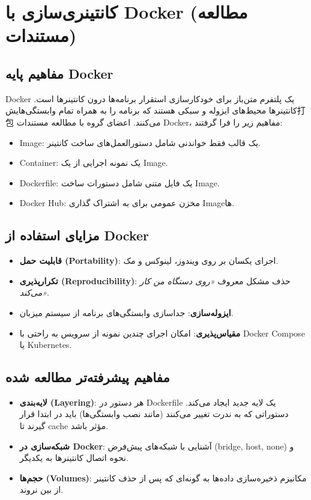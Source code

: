 \documentclass[12pt,a4paper]{report}
\newcommand{\eng}[1]{\textenglish{#1}}
\begin{document}
	\chapter{کانتینری‌سازی با Docker (مطالعه مستندات)}
	
	\section{مفاهیم پایه Docker}
	\eng{Docker} یک پلتفرم متن‌باز برای خودکارسازی استقرار برنامه‌ها درون کانتینرها است. کانتینرها محیط‌های ایزوله و سبکی هستند که برنامه را به همراه تمام وابستگی‌هایش打包 می‌کنند. اعضای گروه با مطالعه مستندات \eng{Docker}، مفاهیم زیر را فرا گرفتند:
	
	\begin{itemize}
		\item \eng{Image}: یک قالب فقط خواندنی شامل دستورالعمل‌های ساخت کانتینر.
		\item \eng{Container}: یک نمونه اجرایی از یک \eng{Image}.
		\item \eng{Dockerfile}: یک فایل متنی شامل دستورات ساخت \eng{Image}.
		\item \eng{Docker Hub}: مخزن عمومی برای به اشتراک گذاری \eng{Image}ها.
	\end{itemize}
	
	\section{مزایای استفاده از Docker}
	\begin{itemize}
		\item \textbf{قابلیت حمل (\eng{Portability})}: اجرای یکسان بر روی ویندوز، لینوکس و مک.
		\item \textbf{تکرارپذیری (\eng{Reproducibility})}: حذف مشکل معروف \emph{«روی دستگاه من کار می‌کند»}.
		\item \textbf{ایزوله‌سازی}: جداسازی وابستگی‌های برنامه از سیستم میزبان.
		\item \textbf{مقیاس‌پذیری}: امکان اجرای چندین نمونه از سرویس به راحتی با \eng{Docker Compose} یا \eng{Kubernetes}.
	\end{itemize}
	
	\section{مفاهیم پیشرفته‌تر مطالعه شده}
	\begin{itemize}
		\item \textbf{لایه‌بندی (\eng{Layering})}: هر دستور در \eng{Dockerfile} یک لایه جدید ایجاد می‌کند. دستوراتی که به ندرت تغییر می‌کنند (مانند نصب وابستگی‌ها) باید در ابتدا قرار گیرند تا \eng{cache} مؤثر باشد.
		\item \textbf{شبکه‌سازی در Docker}: آشنایی با شبکه‌های پیش‌فرض (bridge, host, none) و نحوه اتصال کانتینرها به یکدیگر.
		\item \textbf{حجم‌ها (\eng{Volumes})}: مکانیزم ذخیره‌سازی داده‌ها به گونه‌ای که پس از حذف کانتینر از بین نروند.
	\end{itemize}
	
\end{document}
